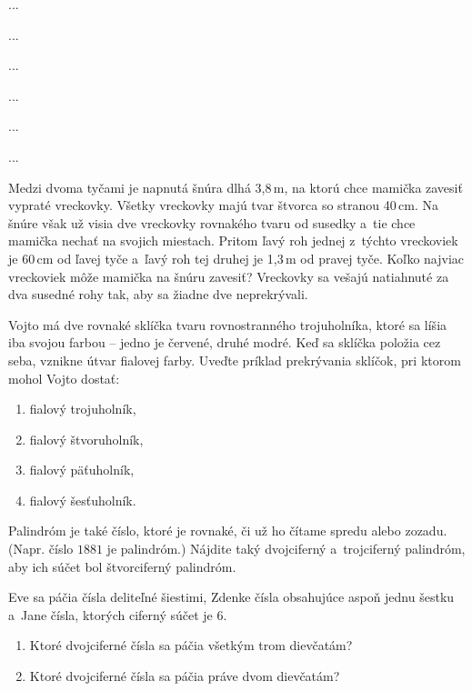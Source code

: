 ﻿{%
...}

{%
...}

{%
...}

{%
...}

{%
...}

{%
...}

{%
Medzi dvoma tyčami je napnutá šnúra dlhá 3{,}8\,m, na ktorú chce
mamička zavesiť vypraté vreckovky.
Všetky vreckovky majú tvar štvorca so stranou 40\,cm.
Na šnúre však už visia dve vreckovky rovnakého tvaru od susedky
a~tie chce mamička nechať na svojich miestach.
Pritom ľavý roh jednej z~týchto vreckoviek je 60\,cm od ľavej tyče a~ľavý
roh tej druhej je 1{,}3\,m od pravej tyče. Koľko najviac vreckoviek môže mamička na šnúru zavesiť?
Vreckovky sa vešajú natiahnuté za dva susedné rohy tak, aby sa žiadne dve neprekrývali.}

{%
Vojto má dve rovnaké sklíčka tvaru rovnostranného trojuholníka, ktoré sa líšia
iba svojou farbou -- jedno je červené, druhé modré.
Keď sa sklíčka položia cez seba, vznikne útvar fialovej farby.
Uveďte príklad prekrývania sklíčok, pri ktorom mohol Vojto dostať:
\begin{enumerate}
  \item fialový trojuholník,
  \item fialový štvoruholník,
  \item fialový päťuholník,
  \item fialový šesťuholník.
\end{enumerate}
}

{%
Palindróm je také číslo, ktoré je rovnaké, či už ho čítame spredu alebo
zozadu. (Napr. číslo $1881$ je palindróm.)
Nájdite taký dvojciferný a~trojciferný palindróm, aby ich súčet
bol štvorciferný palindróm.}

{%
Eve sa páčia čísla deliteľné šiestimi, Zdenke čísla obsahujúce aspoň jednu šestku
a~Jane čísla, ktorých ciferný súčet je $6$.
\begin{enumerate}
  \item Ktoré dvojciferné čísla sa páčia všetkým trom dievčatám?
  \item Ktoré dvojciferné čísla sa páčia práve dvom dievčatám?
\end{enumerate}
}

